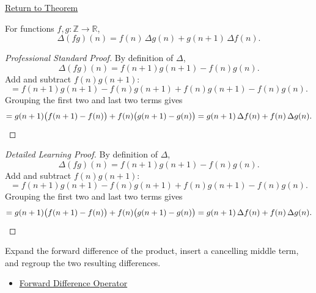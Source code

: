 \newpage
{}
\label{prf:discrete-product-rule}

\begin{remark*}[Return]
\hyperref[thm:discrete-product-rule]{Return to Theorem}
\end{remark*}

\begin{theorem*}
For functions \(f, g : \mathbb{Z} \to \mathbb{R}\),
\[
\Delta(fg)(n)
=
f(n)\,\Delta g(n) + g(n+1)\,\Delta f(n).
\]
\end{theorem*}

\begin{proof}[Professional Standard Proof]
\LRAProofBodyStart
By definition of \(\Delta\),
\[
\Delta(fg)(n) = f(n+1)g(n+1) - f(n)g(n).
\]
Add and subtract \(f(n)g(n+1)\):
\[
= f(n+1)g(n+1) - f(n)g(n+1) + f(n)g(n+1) - f(n)g(n).
\]
Grouping the first two and last two terms gives
\[
= g(n+1)\bigl(f(n+1)-f(n)\bigr) + f(n)\bigl(g(n+1)-g(n)\bigr)
= g(n+1)\,\Delta f(n) + f(n)\,\Delta g(n). \qedhere
\]
\end{proof}

\begin{proof}[Detailed Learning Proof]
\LRAProofBodyStart
By definition of \(\Delta\),
\[
\Delta(fg)(n) = f(n+1)g(n+1) - f(n)g(n).
\]
Add and subtract \(f(n)g(n+1)\):
\[
= f(n+1)g(n+1) - f(n)g(n+1) + f(n)g(n+1) - f(n)g(n).
\]
Grouping the first two and last two terms gives
\[
= g(n+1)\bigl(f(n+1)-f(n)\bigr) + f(n)\bigl(g(n+1)-g(n)\bigr)
= g(n+1)\,\Delta f(n) + f(n)\,\Delta g(n). \qedhere
\]
\end{proof}

\begin{remark*}
Expand the forward difference of the product, insert a cancelling middle
term, and regroup the two resulting differences.
\end{remark*}

\begin{dependencies}
\begin{itemize}
  \item \hyperref[def:forward-difference]{Forward Difference Operator}
\end{itemize}
\end{dependencies}
\clearpage
